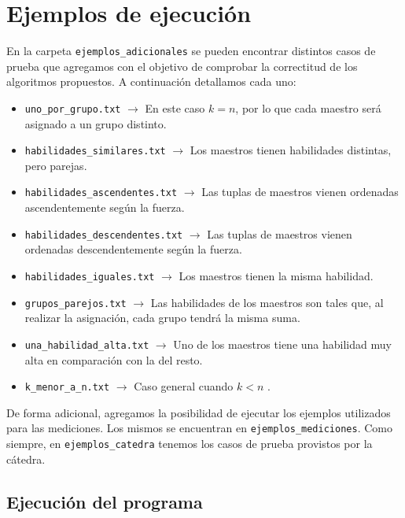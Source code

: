 \documentclass{article}
\begin{document}
\section{Ejemplos de ejecución}
\label{sec:ejemplos}

En la carpeta \texttt{ejemplos\_adicionales} se pueden encontrar distintos casos de prueba que agregamos con el objetivo de comprobar la correctitud de los algoritmos propuestos. A continuación detallamos cada uno:
\begin{itemize}
    \item \texttt{uno\_por\_grupo.txt} $\rightarrow$ En este caso $k = n$, por lo que cada maestro será asignado a un grupo distinto.
    \item \texttt{habilidades\_similares.txt} $\rightarrow$ Los maestros tienen habilidades distintas, pero parejas.
    \item \texttt{habilidades\_ascendentes.txt} $\rightarrow$ Las tuplas de maestros vienen ordenadas ascendentemente según la fuerza.
    \item \texttt{habilidades\_descendentes.txt} $\rightarrow$ Las tuplas de maestros vienen ordenadas descendentemente según la fuerza.
    \item \texttt{habilidades\_iguales.txt} $\rightarrow$ Los maestros tienen la misma habilidad.
    \item \texttt{grupos\_parejos.txt} $\rightarrow$ Las habilidades de los maestros son tales que, al realizar la asignación, cada grupo tendrá la misma suma.
    \item \texttt{una\_habilidad\_alta.txt} $\rightarrow$ Uno de los maestros tiene una habilidad muy alta en comparación con la del resto.
    \item \texttt{k\_menor\_a\_n.txt} $\rightarrow$ Caso general cuando $k < n$ .
\end{itemize}

De forma adicional, agregamos la posibilidad de ejecutar los ejemplos utilizados para las mediciones. Los mismos se encuentran en \texttt{ejemplos\_mediciones}. Como siempre, en \texttt{ejemplos\_catedra} tenemos los casos de prueba provistos por la cátedra.

\subsection{Ejecución del programa}
\end{document}
